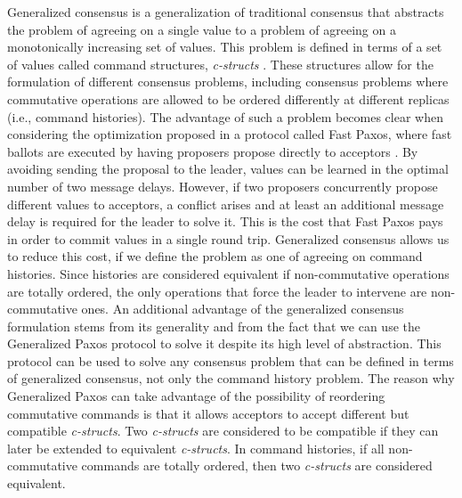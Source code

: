 Generalized consensus is a generalization of traditional consensus that abstracts the problem of agreeing on a single value to a problem of agreeing on a monotonically increasing set of values. This problem is defined in terms of a set of values called command structures, \textit{c-structs} \cite{Lamport2005}. These structures allow for the formulation of different consensus problems, including consensus problems where commutative operations are allowed to be ordered differently at different replicas (i.e., command histories). The advantage of such a problem becomes clear when considering the optimization proposed in a protocol called Fast Paxos, where fast ballots are executed by having proposers propose directly to acceptors \cite{Lamport2006}. By avoiding sending the proposal to the leader, values can be learned in the optimal number of two message delays. However, if two proposers concurrently propose different values to acceptors, a conflict arises and at least an additional message delay is required for the leader to solve it. This is the cost that Fast Paxos pays in order to commit values in a single round trip.  Generalized consensus allows us to reduce this cost, if we define the problem as one of agreeing on command histories. Since histories are considered equivalent if non-commutative operations are totally ordered, the only operations that force the leader to intervene are non-commutative ones. An additional advantage of the generalized consensus formulation stems from its generality and from the fact that we can use the Generalized Paxos protocol to solve it despite its high level of abstraction. This protocol can be used to solve any consensus problem that can be defined in terms of generalized consensus, not only the command history problem. The reason why Generalized Paxos can take advantage of the possibility of reordering commutative commands is that it allows acceptors to accept different but compatible \textit{c-structs}. Two \textit{c-structs} are considered to be compatible if they can later be extended to equivalent \textit{c-structs}. In command histories, if all non-commutative commands are totally ordered, then two \textit{c-structs} are considered equivalent. \par
